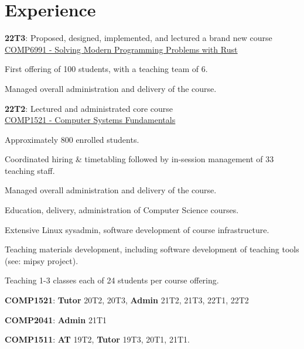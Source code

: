 \documentclass[a4paper]{deedy-resume}
\begin{document}
\begin{minipage}[t]{0.66\textwidth}


\section{Experience}


\vspace{\topsep} %
\begin{tightitemize}
\item
	\textbf{22T3}: Proposed, designed, implemented, and lectured
	a brand new course \\
	\href{https://www.handbook.unsw.edu.au/undergraduate/courses/current/COMP6991}
		 {\underline{COMP6991 - Solving Modern Programming Problems with Rust}}
\item First offering of 100 students, with a teaching team of 6.
\item Managed overall administration and delivery of the course.
\item
	\textbf{22T2}: Lectured and administrated core course \\
	\href{https://www.handbook.unsw.edu.au/undergraduate/courses/current/COMP1521}
		 {\underline{COMP1521 - Computer Systems Fundamentals}}
\item Approximately 800 enrolled students.
\item Coordinated hiring \& timetabling followed by
	  in-session management of 33 teaching staff.
\item Managed overall administration and delivery of the course.
\end{tightitemize}

\sectionspace



\begin{tightitemize}
\item Education, delivery, administration of Computer Science courses.
\item Extensive Linux sysadmin,
	  software development of course infrastructure.
\item Teaching materials development, including software
	  development of teaching tools (see: mipsy project).
\item Teaching 1-3 classes each of 24 students per course offering.
\item \textbf{COMP1521}: \textbf{Tutor} 20T2, 20T3,
						 \textbf{Admin} 21T2, 21T3, 22T1, 22T2
\item \textbf{COMP2041}: \textbf{Admin} 21T1
\item \textbf{COMP1511}: \textbf{AT}    19T2,
						 \textbf{Tutor} 19T3, 20T1, 21T1.
\end{tightitemize}


\end{minipage}
\end{document}
